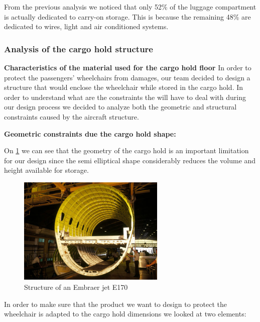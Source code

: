 From the previous analysis we noticed that only 52\% of the luggage compartment is actually dedicated to carry-on storage. This is because the remaining 48\% are dedicated to wires, light and air conditioned systems.

\subsubsection*{Analysis of the cargo hold structure}

\textbf{Characteristics of the material used for the cargo hold floor}
In order to protect the passengers’ wheelchairs from damages, our team decided to design a structure that would enclose the wheelchair while stored in the cargo hold. In order to understand what are the constraints the will have to deal with during our design process we decided to analyze both the geometric and structural constraints caused by the aircraft structure.

\textbf{Geometric constraints due the cargo hold shape:}

On \ref{fig:aircraft_structure} we can see that the geometry of the cargo hold is an important limitation for our design since the semi elliptical shape considerably reduces the volume and height available for storage.

\begin{figure}[h]
\centering
\includegraphics[width=7cm]{images/aircraft_structure.png}
\caption{Structure of an Embraer jet E170 \cite{embraer_struct}}
\label{fig:aircraft_structure}
\end{figure}

In order to make sure that the product we want to design to protect the wheelchair is adapted to the cargo hold dimensions we looked at two elements:

